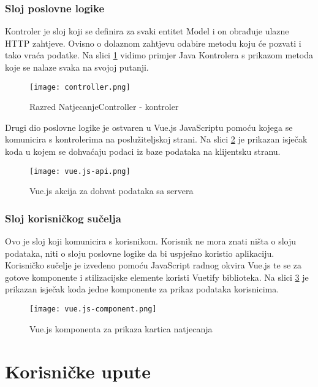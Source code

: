 \documentclass[times, utf8, zavrsni]{fer}
\begin{document}
\subsection{Sloj poslovne logike}

Kontroler  je sloj koji se definira za svaki entitet Model i on obrađuje ulazne HTTP zahtjeve. Ovisno o dolaznom zahtjevu
odabire metodu koju će pozvati i tako vraća podatke. Na slici \ref{fig:controller} vidimo primjer Java Kontrolera s prikazom metoda
koje se nalaze svaka na svojoj putanji.

\begin{figure}[!h]
    \centering
    \texttt{[image: controller.png]}
    \centering
    \caption{Razred NatjecanjeController - kontroler}
    \label{fig:controller}
\end{figure}

Drugi dio poslovne logike je ostvaren u Vue.js JavaScriptu pomoću kojega se komunicira s kontrolerima na poslužiteljskoj strani.
Na slici \ref{fig:vue.js-api} je prikazan isječak koda u kojem se dohvaćaju podaci iz baze podataka na klijentsku stranu. 

\begin{figure}[!h]
    \centering
    \texttt{[image: vue.js-api.png]}
    \centering
    \caption{Vue.js akcija za dohvat podataka sa servera}
    \label{fig:vue.js-api}
\end{figure}

\subsection{Sloj korisničkog sučelja}
Ovo je sloj koji komunicira s korisnikom. Korisnik ne mora znati ništa o sloju podataka, niti o sloju poslovne logike da bi uspješno
koristio aplikaciju. Korisničko sučelje je izvedeno pomoću JavaScript radnog okvira Vue.js te se za gotove komponente i stilizacijske
elemente koristi Vuetify biblioteka. Na slici \ref{fig:vue.js-component} je prikazan isječak koda jedne komponente za prikaz podataka korisnicima.

\begin{figure}[!h]
    \centering
    \texttt{[image: vue.js-component.png]}
    \centering
    \caption{Vue.js komponenta za prikaza kartica natjecanja}
    \label{fig:vue.js-component}
\end{figure}


\chapter{Korisničke upute}
\end{document}
